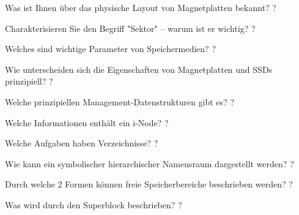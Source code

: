 \documentclass[avery5371]{flashcards}
\begin{document}
\begin{flashcard}[Dateisysteme]{Was ist Ihnen über das physische Layout von Magnetplatten bekannt?}
    ?
\end{flashcard}

\begin{flashcard}[Dateisysteme]{Charakterisieren Sie den Begriff "Sektor" – warum ist er wichtig?}
    ?
\end{flashcard}

\begin{flashcard}[Dateisysteme]{Welches sind wichtige Parameter von Speichermedien?}
    ?
\end{flashcard}

\begin{flashcard}[Dateisysteme]{Wie unterscheiden sich die Eigenschaften von Magnetplatten und SSDs prinzipiell?}
    ?
\end{flashcard}

\begin{flashcard}[Dateisysteme]{Welche prinzipiellen Management-Datenstrukturen gibt es?}
    ?
\end{flashcard}

\begin{flashcard}[Dateisysteme]{Welche Informationen enthält ein i-Node?}
    ?
\end{flashcard}

\begin{flashcard}[Dateisysteme]{Welche Aufgaben haben Verzeichnisse?}
    ?
\end{flashcard}

\begin{flashcard}[Dateisysteme]{Wie kann ein symbolischer hierarchischer Namensraum dargestellt werden?}
    ?
\end{flashcard}

\begin{flashcard}[Dateisysteme]{Durch welche 2 Formen können freie Speicherbereiche beschrieben werden?}
    ?
\end{flashcard}

\begin{flashcard}[Dateisysteme]{Was wird durch den Superblock beschrieben?}
    ?
\end{flashcard}
\end{document}
